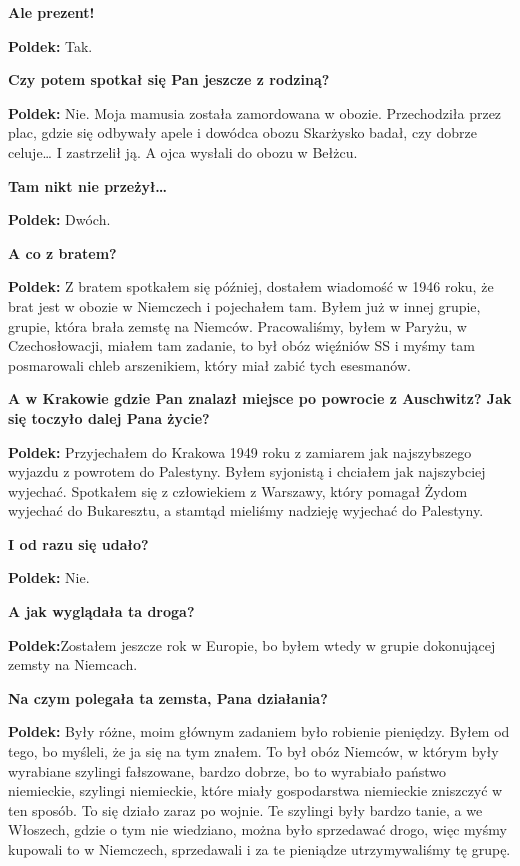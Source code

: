 \textbf{Ale prezent!}\par 
\textbf{Poldek:} Tak.\par   
\textbf{Czy potem spotkał się Pan jeszcze z rodziną?}\par 
\textbf{Poldek:} Nie. Moja mamusia została zamordowana w obozie. Przechodziła przez plac, gdzie się odbywały apele i dowódca obozu Skarżysko badał, czy dobrze celuje… I zastrzelił ją. A ojca wysłali do obozu w Bełżcu.\par 
\textbf{Tam nikt nie przeżył…}\par
\textbf{Poldek:} Dwóch.\par 
\textbf{A co z bratem?}\par 
\textbf{Poldek:} Z bratem spotkałem się później, dostałem wiadomość w 1946 roku, że brat jest w obozie w Niemczech i pojechałem tam. Byłem już w innej grupie, grupie, która brała zemstę na Niemców. Pracowaliśmy, byłem w Paryżu, w Czechosłowacji, miałem tam zadanie, to był obóz więźniów SS i myśmy tam posmarowali chleb arszenikiem, który miał zabić tych esesmanów.\par
\textbf{A w Krakowie gdzie Pan znalazł miejsce po powrocie z Auschwitz? Jak się toczyło dalej Pana życie?}\par
\textbf{Poldek:} Przyjechałem do Krakowa 1949 roku z zamiarem jak najszybszego wyjazdu z powrotem do Palestyny. Byłem syjonistą i chciałem jak najszybciej wyjechać. Spotkałem się z człowiekiem z Warszawy, który pomagał Żydom wyjechać do Bukaresztu, a stamtąd mieliśmy nadzieję wyjechać do Palestyny.\par 
\textbf{I od razu się udało?}\par
\textbf{Poldek:} Nie.\par 
\textbf{A jak wyglądała ta droga?}\par  
\textbf{Poldek:}Zostałem jeszcze rok w Europie, bo byłem wtedy w grupie dokonującej zemsty na Niemcach.\par 
\textbf{Na czym polegała ta zemsta, Pana działania?}\par  
\textbf{Poldek:} Były różne, moim głównym zadaniem było robienie pieniędzy. Byłem od tego, bo myśleli, że ja się na tym znałem. To był obóz Niemców, w którym były wyrabiane szylingi fałszowane, bardzo dobrze, bo to wyrabiało państwo niemieckie, szylingi niemieckie, które miały gospodarstwa niemieckie zniszczyć w ten sposób. To się działo zaraz po wojnie. Te szylingi były bardzo tanie, a we Włoszech, gdzie o tym nie wiedziano, można było sprzedawać drogo, więc myśmy kupowali to w Niemczech, sprzedawali i za te pieniądze utrzymywaliśmy tę grupę.\par 

